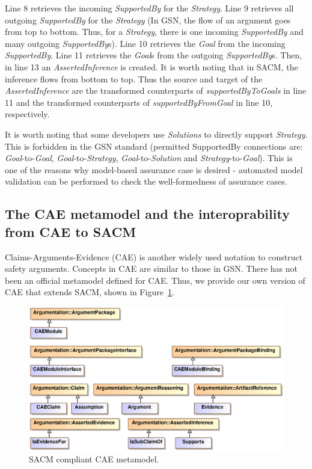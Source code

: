 Line 8 retrieves the incoming \textit{SupportedBy}  for the \textit{Strategy}.
Line 9 retrieves all outgoing \textit{SupportedBy} for the \textit{Strategy} (In GSN, the flow of an argument goes from top to bottom. Thus, for a \textit{Strategy}, there is one incoming \textit{SupportedBy} and many outgoing \textit{SupportedBy}s).
Line 10 retrieves the \textit{Goal} from the incoming \textit{SupportedBy}.
Line 11 retrieves the \textit{Goal}s from the outgoing \textit{SupportedBy}s. 
Then, in line 13 an \textit{AssertedInference} is created. 
It is worth noting that in SACM, the inference flows from bottom to top. Thus the source and target of the \textit{AssertedInference} are the transformed counterparts of \textit{supportedByToGoals} in line 11 and the transformed counterparts of \textit{supportedByFromGoal} in line 10, respectively.

It is worth noting that some developers use \textit{Solutions} to directly support \textit{Strategy}. 
This is forbidden in the GSN standard (permitted SupportedBy connections are: \textit{Goal}-to-\textit{Goal}, \textit{Goal}-to-\textit{Strategy}, \textit{Goal}-to-\textit{Solution} and \textit{Strategy}-to-\textit{Goal}). 
This is one of the reasons why model-based assurance case is desired - automated model validation can be performed to check the well-formedness of assurance cases.

\subsection{The CAE metamodel and the interoprability from CAE to SACM}
Claims-Arguments-Evidence (CAE) \cite{bishop2000methodology} is another widely used notation to construct safety arguments. Concepts in CAE are similar to those in GSN. 
There has not been an official metamodel defined for CAE. Thus, we provide our own version of CAE that extends SACM, shown in Figure~\ref{fig:caeMetamodel}.


\begin{figure}
	\centering
	\includegraphics[width=1\linewidth]{CAE.eps}
	\caption{SACM compliant CAE metamodel.}
	\label{fig:caeMetamodel}
\end{figure}

